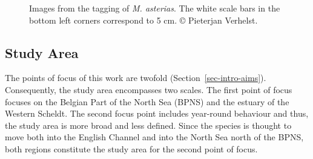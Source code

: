 \documentclass[
  authoryear,
  review,
  3p]{elsarticle}
\begin{document}
\begin{figure}

\begin{minipage}[t]{0.33\linewidth}

{\centering 


}

\end{minipage}%
%
\begin{minipage}[t]{0.33\linewidth}

{\centering 


}

\end{minipage}%
%
\begin{minipage}[t]{0.33\linewidth}

{\centering 


}

\end{minipage}%

\caption{\label{fig-taggingpics}Images from the tagging of \emph{M.
asterias}. The white scale bars in the bottom left corners correspond to
5 cm. © Pieterjan Verhelst.}

\end{figure}

\hypertarget{sec-mm_studyarea}{%
\subsection{Study Area}\label{sec-mm_studyarea}}

The points of focus of this work are twofold
(Section~\ref{sec-intro-aims}). Consequently, the study area encompasses
two scales. The first point of focus focuses on the Belgian Part of the
North Sea (BPNS) and the estuary of the Western Scheldt. The second
focus point includes year-round behaviour and thus, the study area is
more broad and less defined. Since the species is thought to move both
into the English Channel and into the North Sea north of the BPNS, both
regions constitute the study area for the second point of focus.
\end{document}
